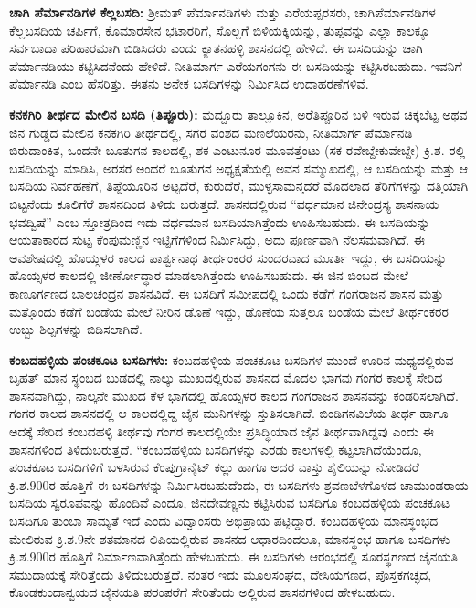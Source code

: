 \textbf{ಚಾಗಿ ಪೆರ್ಮಾನಡಿಗಳ ಕೆಲ್ಲಬಸದಿ:} ಶ‍್ರೀಮತ್​ ಪೆರ್ಮಾನಡಿಗಳು ಮತ್ತು ಎರೆಯಪ್ಪರಸರು, ಚಾಗಿಪೆರ್ಮಾನಡಿಗಳ ಕೆಲ್ಲಬಸದಿಯ ಚರ್ಪಿಗೆ, ಕೊಮಾರಸೇನ ಭಟಾರರಿಗೆ, ಸೊಲ್ಲಗೆ ಬಿಳಿಯಕ್ಕಿಯನ್ನು, ತುಪ್ಪವನ್ನು ಎಲ್ಲಾ ಕಾಲಕ್ಕೂ ಸರ್ವಬಾದಾ ಪರಿಹಾರಮಾಗಿ ಬಿಡಿಸಿದರು ಎಂದು ಕ್ಯಾತನಹಳ್ಳಿ ಶಾಸನದಲ್ಲಿ ಹೇಳಿದೆ. ಈ ಬಸದಿಯನ್ನು ಚಾಗಿ ಪೆರ್ಮಾನಡಿಯು ಕಟ್ಟಿಸಿದನೆಂದು ಹೇಳಿದೆ. ನೀತಿಮಾರ್ಗ ಎರೆಯಗಂಗನು ಈ ಬಸದಿಯನ್ನು ಕಟ್ಟಿಸಿರಬಹುದು. ಇವನಿಗೆ ಪೆರ್ಮಾನಡಿ ಎಂಬ ಹೆಸರಿತ್ತು. ಈತನು ಅನೇಕ ಬಸದಿಗಳನ್ನು ನಿರ್ಮಿಸಿದ ಉದಾಹರಣೆಗಳಿವೆ.

\textbf{ಕನಕಗಿರಿ ತೀರ್ಥದ ಮೇಲಿನ ಬಸದಿ (ತಿಪ್ಪೂರು):} ಮದ್ದೂರು ತಾಲ್ಲೂಕಿನ, ಅರೆತಿಪ್ಪೂರಿನ ಬಳಿ ಇರುವ ಚಿಕ್ಕಬೆಟ್ಟ ಅಥವ ಜಿನ ಗುಡ್ಡದ ಮೇಲಿನ ಕನಕಗಿರಿ ತೀರ್ಥದಲ್ಲಿ, ಸಗರ ವಂಶದ ಮಣಲೆಯರನು, ನೀತಿಮಾರ್ಗ ಪೆರ್ಮಾನಡಿ ಬಿರುದಾಂಕಿತ, ಒಂದನೇ ಬೂತುಗನ ಕಾಲದಲ್ಲಿ, ಶಕ ಎಂಟುನೂರ ಮೂವತ್ತೆಂಟು (ಸಕ ರವೇಬ್ದೇಕುವೇಬ್ದೇ) ಕ್ರಿ.ಶ. ರಲ್ಲಿ ಬಸದಿಯನ್ನು ಮಾಡಿಸಿ, ಅರಸರ ಅಂದರೆ ಬೂತುಗನ ಅಧ್ಯಕ್ಷತೆಯಲ್ಲಿ ಅವನ ಸಮ್ಮುಖದಲ್ಲಿ, ಆ ಬಸದಿಯನ್ನು ಮತ್ತು ಆ ಬಸದಿಯ ನಿರ್ವಹಣೆಗೆ, ತಿಪ್ಪೆಯೂರಿನ ಅಟ್ಟದೆರೆ, ಕುರುದೆರೆ, ಮುಳ್ಳಸಾಮನ್ತದರೆ ಮೊದಲಾದ ತೆರಿಗೆಗಳನ್ನು ದತ್ತಿಯಾಗಿ ಬಿಟ್ಟನೆಂದು ಕೂಲಿಗೆರೆ ಶಾಸನದಿಂದ ತಿಳಿದು ಬರುತ್ತದೆ. ಶಾಸನದಲ್ಲಿರುವ “ವರ್ಧಮಾನ ಜಿನೇಂದ್ರಸ್ಯ ಶಾಸನಾಯ ಭವದ್ವಿಷೆ” ಎಂಬ ಸ್ತೋತ್ರದಿಂದ ಇದು ವರ್ಧಮಾನ ಬಸದಿಯಾಗಿತ್ತೆಂದು ಊಹಿಸಬಹುದು. ಈ ಬಸದಿಯನ್ನು ಆಯತಾಕಾರದ ಸುಟ್ಟ ಕೆಂಪುಮಣ್ಣಿನ ಇಟ್ಟಿಗೆಗಳಿಂದ ನಿರ್ಮಿಸಿದ್ದು, ಅದು ಪೂರ್ಣವಾಗಿ ನೆಲಸಮವಾಗಿದೆ. ಈ ಅವಶೇಷದಲ್ಲಿ ಹೊಯ್ಸಳರ ಕಾಲದ ಪಾರ್ಶ್ವನಾಥ ತೀರ್ಥಂಕರರ ಸುಂದರವಾದ ಮೂರ್ತಿ ಇದ್ದು, ಈ ಬಸದಿಯನ್ನು ಹೊಯ್ಸಳರ ಕಾಲದಲ್ಲಿ ಜೀರ್ಣೋದ್ಧಾರ ಮಾಡಲಾಗಿತ್ತೆಂದು ಊಹಿಸಬಹುದು. ಈ ಜಿನ ಬಿಂಬದ ಮೇಲೆ ಕಾಣೂರ್ಗಣದ ಬಾಲಚಂದ್ರನ ಶಾಸನವಿದೆ. ಈ ಬಸದಿಗೆ ಸಮೀಪದಲ್ಲಿ ಒಂದು ಕಡೆಗೆ ಗಂಗರಾಜನ ಶಾಸನ ಮತ್ತು ಮತ್ತೊಂದು ಕಡೆಗೆ ಬಂಡೆಯ ಮೇಲೆ ನೀರಿನ ಡೊಣೆ ಇದ್ದು, ಡೊಣೆಯ ಸುತ್ತಲೂ ಬಂಡೆಯ ಮೇಲೆ ತೀರ್ಥಂಕರರ ಉಬ್ಬು ಶಿಲ್ಪಗಳನ್ನು ಬಿಡಿಸಲಾಗಿದೆ.

\textbf{ಕಂಬದಹಳ್ಳಿಯ ಪಂಚಕೂಟ ಬಸದಿಗಳು:} ಕಂಬದಹಳ್ಳಿಯ ಪಂಚಕೂಟ ಬಸದಿಗಳ ಮುಂದೆ ಊರಿನ ಮಧ್ಯದಲ್ಲಿರುವ ಬೃಹತ್ ಮಾನ ಸ್ಥಂಬದ ಬುಡದಲ್ಲಿ ನಾಲ್ಕು ಮುಖದಲ್ಲಿರುವ ಶಾಸನದ ಮೊದಲ ಭಾಗವು ಗಂಗರ ಕಾಲಕ್ಕೆ ಸೇರಿದ ಶಾಸನವಾಗಿದ್ದು, ನಾಲ್ಕನೇ ಮುಖದ ಕೆಳ ಭಾಗದಲ್ಲಿ ಹೊಯ್ಸಳರ ಕಾಲದ ಗಂಗರಾಜನ ಶಾಸನವನ್ನು ಕಂಡರಿಸಲಾಗಿದೆ. ಗಂಗರ ಕಾಲದ ಶಾಸನದಲ್ಲಿ ಆ ಕಾಲದಲ್ಲಿದ್ದ ಜೈನ ಮುನಿಗಳನ್ನು ಸ್ತುತಿಸಲಾಗಿದೆ. ಬಿಂಡಿಗನವಿಲೆಯ ತೀರ್ಥ ಹಾಗೂ ಅದಕ್ಕೆ ಸೇರಿದ ಕಂಬದಹಳ್ಳಿ ತೀರ್ಥವು ಗಂಗರ ಕಾಲದಲ್ಲಿಯೇ ಪ್ರಸಿದ್ಧಿಯಾದ ಜೈನ ತೀರ್ಥವಾಗಿದ್ದವು ಎಂದು ಈ ಶಾಸನಗಳಿಂದ ತಿಳಿದುಬರುತ್ತದೆ. “ಕಂಬದಹಳ್ಳಿಯ ಬಸದಿಗಳನ್ನು ಎರಡು ಕಾಲಗಳಲ್ಲಿ ಕಟ್ಟಲಾಗಿದೆಯೆಂದೂ, ಪಂಚಕೂಟ ಬಸದಿಗಳಿಗೆ ಬಳಸಿರುವ ಕೆಂಪುಗ್ರಾನೈಟ್​ ಕಲ್ಲು ಹಾಗೂ ಅದರ ವಾಸ್ತು ಶೈಲಿಯನ್ನು ನೋಡಿದರೆ ಕ್ರಿ.ಶ.900ರ ಹೊತ್ತಿಗೆ ಈ ಬಸದಿಗಳನ್ನು ನಿರ್ಮಿಸಿರಬಹುದೆಂದು, ಈ ಬಸದಿಗಳು ಶ್ರವಣಬೆಳಗೊಳದ ಚಾಮುಂಡರಾಯ ಬಸದಿಯ ಸ್ವರೂಪವನ್ನು ಹೊಂದಿವೆ ಎಂದೂ, ಜಿನದೇವಣ್ಣನು ಕಟ್ಟಿಸಿರುವ ಬಸದಿಗೂ ಕಂಬದಹಳ್ಳಿಯ ಪಂಚಕೂಟ ಬಸದಿಗೂ ತುಂಬಾ ಸಾಮ್ಯತೆ ಇದೆ ಎಂದು ವಿದ್ವಾಂಸರು ಅಭಿಪ್ರಾಯ ಪಟ್ಟಿದ್ದಾರೆ. ಕಂಬದಹಳ್ಳಿಯ ಮಾನಸ್ಥಂಭದ ಮೇಲಿರುವ ಕ್ರಿ.ಶ.9ನೇ ಶತಮಾನದ ಲಿಪಿಯಲ್ಲಿರುವ ಶಾಸನದ ಆಧಾರದಿಂದಲೂ, ಮಾನಸ್ಥಂಭ ಹಾಗೂ ಬಸದಿಗಳು ಕ್ರಿ.ಶ.900ರ ಹೊತ್ತಿಗೆ ನಿರ್ಮಾಣವಾಗಿತ್ತೆಂದು ಹೇಳಬಹುದು. ಈ ಬಸದಿಗಳು ಆರಂಭದಲ್ಲಿ ಸೂರಸ್ಥಗಣದ ಜೈನಯತಿ ಸಮುದಾಯಕ್ಕೆ ಸೇರಿತ್ತೆಂದು ತಿಳಿದುಬರುತ್ತದೆ. ನಂತರ ಇದು ಮೂಲಸಂಘದ, ದೇಸಿಯಗಣದ, ಪೊಸ್ತಕಗಚ್ಛದ, ಕೊಂಡಕುಂದಾನ್ವಯದ ಜೈನಯತಿ ಪರಂಪರೆಗೆ ಸೇರಿತೆಂದು ಅಲ್ಲಿರುವ ಶಾಸನಗಳಿಂದ ಹೇಳಬಹುದು.

